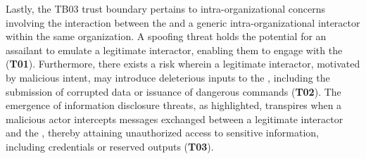 \begin{newj}
Lastly, the TB03 trust boundary pertains to intra-organizational concerns involving the interaction between the  and a generic intra-organizational interactor within the same organization. A spoofing threat holds the potential for an assailant to emulate a legitimate interactor, enabling them to engage with the  (\textbf{T01}). Furthermore, there exists a risk wherein a legitimate interactor, motivated by malicious intent, may introduce deleterious inputs to the , including the submission of corrupted data or issuance of dangerous commands (\textbf{T02}). The emergence of information disclosure threats, as highlighted, transpires when a malicious actor intercepts messages exchanged between a legitimate interactor and the , thereby attaining unauthorized access to sensitive information, including credentials or reserved outputs (\textbf{T03}).
\end{newj}


